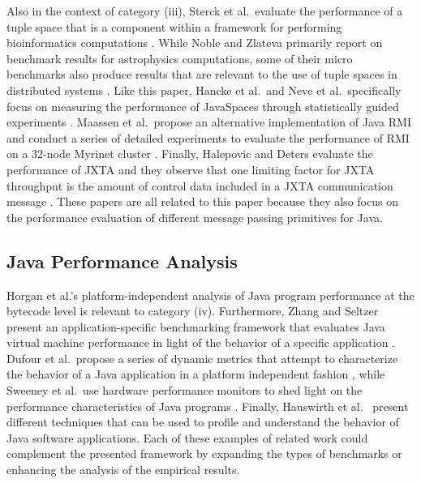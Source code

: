 \documentclass{sig-alternate}
\begin{document}
Also in the context of category (iii), Sterck et al.\ evaluate the
performance of a tuple space that is a component within a framework
for performing bioinformatics computations
\cite{sterck-taskspaces-book,sterck-taskspaces}.  While Noble and
Zlateva primarily report on benchmark results for astrophysics
computations, some of their micro benchmarks also produce results that
are relevant to the use of tuple spaces in distributed systems
\cite{noble-javaspaces}.  Like this paper, Hancke et al.\ and Neve et
al.\ specifically focus on measuring the performance of JavaSpaces
through statistically guided experiments
\cite{hancke-js-overhead,neve-doe-js}.  Maassen et al.\ propose an
alternative implementation of Java RMI and conduct a series of
detailed experiments to evaluate the performance of RMI on a 32-node
Myrinet cluster \cite{maasen-java-rmi}.  Finally, Halepovic and Deters
evaluate the performance of JXTA and they observe that one limiting
factor for JXTA throughput is the amount of control data included in a
JXTA communication message \cite{halepovic-jxta}.  These papers are
all related to this paper because they also focus on the performance
evaluation of different message passing primitives for Java.


\vspace*{-.1in}

\subsection{Java Performance Analysis}
\label{sec:java-perf-analys}


Horgan et al.'s platform-independent analysis of Java program
performance at the bytecode level \cite{horgan-measure-runtime} is
relevant to category (iv).  Furthermore, Zhang and Seltzer present an
application-specific benchmarking framework that evaluates Java
virtual machine performance in light of the behavior of a specific
application \cite{zhang-hbenchjava}.  Dufour et al.\ propose a series
of dynamic metrics that attempt to characterize the behavior of a Java
application in a platform independent fashion \cite{dufour-metrics},
while Sweeney et al.\ use hardware performance monitors to shed light
on the performance characteristics of Java programs
\cite{sweeney-hardware}.  Finally, Hauswirth et
al.\ \cite{hauswirth-profile} present different techniques that can be
used to profile and understand the behavior of Java software
applications. Each of these examples of related work could complement
the presented framework by expanding the types of benchmarks or
enhancing the analysis of the empirical results.
\end{document}
